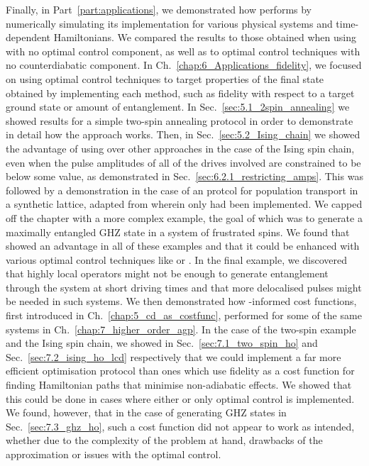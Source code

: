 Finally, in Part~\ref{part:applications}, we demonstrated how  performs by numerically simulating its implementation for various physical systems and time-dependent Hamiltonians. We compared the results to those obtained when using  with no optimal control component, as well as to optimal control techniques with no counterdiabatic component. In Ch.~\ref{chap:6_Applications_fidelity}, we focused on using optimal control techniques to target properties of the final state obtained by implementing each method, such as fidelity with respect to a target ground state or amount of entanglement. In Sec.~\ref{sec:5.1_2spin_annealing} we showed results for a simple two-spin annealing protocol in order to demonstrate in detail how the  approach works. Then, in Sec.~\ref{sec:5.2_Ising_chain} we showed the advantage of using  over other approaches in the case of the Ising spin chain, even when the pulse amplitudes of all of the drives involved are constrained to be below some value, as demonstrated in Sec.~\ref{sec:6.2.1_restricting_amps}. This was followed by a demonstration in the case of an  protcol for population transport in a synthetic lattice, adapted from \cite{meier_counterdiabatic_2020} wherein only  had been implemented. We capped off the chapter with a more complex example, the goal of which was to generate a maximally entangled GHZ state in a system of frustrated spins. We found that  showed an advantage in all of these examples and that it could be enhanced with various optimal control techniques like  or . In the final example, we discovered that highly local  operators might not be enough to generate entanglement through the system at short driving times and that more delocalised pulses might be needed in such systems. We then demonstrated how -informed cost functions, first introduced in Ch.~\ref{chap:5_cd_as_costfunc}, performed for some of the same systems in Ch.~\ref{chap:7_higher_order_agp}. In the case of the two-spin example and the Ising spin chain, we showed in Sec.~\ref{sec:7.1_two_spin_ho} and Sec.~\ref{sec:7.2_ising_ho_lcd} respectively that we could implement a far more efficient optimisation protocol than ones which use fidelity as a cost function for finding Hamiltonian paths that minimise non-adiabatic effects. We showed that this could be done in cases where either  or only optimal control is implemented. We found, however, that in the case of generating GHZ states in Sec.~\ref{sec:7.3_ghz_ho}, such a cost function did not appear to work as intended, whether due to the complexity of the problem at hand, drawbacks of the  approximation or issues with the optimal control. 

